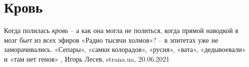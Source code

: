  
 
 
 
 
\chapter{Кровь}
\label{sec:slova.krovj}

Когда полилась \emph{кровь} – а как она могла не политься, когда прямой
наводкой в мозг бьет из всех эфиров «Радио тысячи холмов»? – в эпитетах уже не
заморачивались. «Сепары», «самки колорадов», «русня», «вата», «дедывоевали» и
«там нет генов»
, 
Игорь Лесев, strana.ua, 20.06.2021

